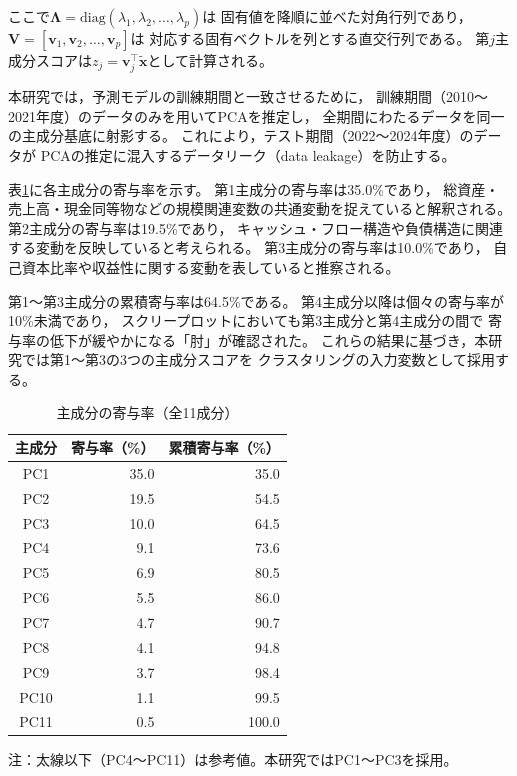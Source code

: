 ここで$\boldsymbol{\Lambda} = \mathrm{diag}(\lambda_1, \lambda_2, \ldots, \lambda_p)$は
固有値を降順に並べた対角行列であり，$\mathbf{V} = [\mathbf{v}_1, \mathbf{v}_2, \ldots, \mathbf{v}_p]$は
対応する固有ベクトルを列とする直交行列である。
第$j$主成分スコアは$z_j = \mathbf{v}_j^{\top} \tilde{\mathbf{x}}$として計算される。

本研究では，予測モデルの訓練期間と一致させるために，
訓練期間（2010〜2021年度）のデータのみを用いてPCAを推定し，
全期間にわたるデータを同一の主成分基底に射影する。
これにより，テスト期間（2022〜2024年度）のデータが
PCAの推定に混入するデータリーク（data leakage）を防止する。

表\ref{tab:pca-variance}に各主成分の寄与率を示す。
第1主成分の寄与率は35.0\%であり，
総資産・売上高・現金同等物などの規模関連変数の共通変動を捉えていると解釈される。
第2主成分の寄与率は19.5\%であり，
キャッシュ・フロー構造や負債構造に関連する変動を反映していると考えられる。
第3主成分の寄与率は10.0\%であり，
自己資本比率や収益性に関する変動を表していると推察される。

第1〜第3主成分の累積寄与率は64.5\%である。
第4主成分以降は個々の寄与率が10\%未満であり，
スクリープロットにおいても第3主成分と第4主成分の間で
寄与率の低下が緩やかになる「肘」が確認された。
これらの結果に基づき，本研究では第1〜第3の3つの主成分スコアを
クラスタリングの入力変数として採用する。

\begin{table}[htbp]
  \centering
  \caption{主成分の寄与率（全11成分）}
  \label{tab:pca-variance}
  \begin{tabular}{crr}
    \toprule
    主成分 & 寄与率（\%） & 累積寄与率（\%） \\
    \midrule
    PC1  & 35.0 & 35.0 \\
    PC2  & 19.5 & 54.5 \\
    PC3  & 10.0 & 64.5 \\
    \midrule
    PC4  &  9.1 & 73.6 \\
    PC5  &  6.9 & 80.5 \\
    PC6  &  5.5 & 86.0 \\
    PC7  &  4.7 & 90.7 \\
    PC8  &  4.1 & 94.8 \\
    PC9  &  3.7 & 98.4 \\
    PC10 &  1.1 & 99.5 \\
    PC11 &  0.5 & 100.0 \\
    \bottomrule
  \end{tabular}
  \begin{tablenotes}
    \small
    \item 注：太線以下（PC4〜PC11）は参考値。本研究ではPC1〜PC3を採用。
  \end{tablenotes}
\end{table}

